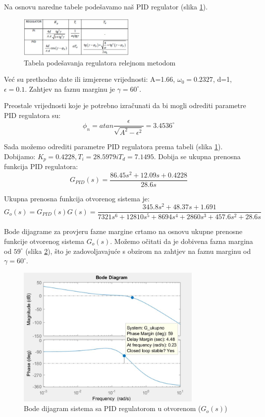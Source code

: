 Na osnovu naredne tabele podešavamo naš PID regulator (slika \ref{fig:z3_3}).

\begin{figure} [H]
  \centering
  \includegraphics[width=0.5\textwidth]{z3_3}
  \caption{Tabela podešavanja regulatora relejnom metodom}
  \label{fig:z3_3}
\end{figure}

Već su prethodno date ili izmjerene vrijednosti: A=1.66, $\omega_0=0.2327$, d=1, $\epsilon=0.1$. Zahtjev na faznu marginu je $\gamma=60^{\circ}$.

Preostale vrijednosti koje je potrebno izračunati da bi mogli odrediti parametre PID regulatora su:
	\[\phi_n=atan\frac{\epsilon}{\sqrt{A^2-\epsilon^2}}=3.4536^{\circ}\]

Sada možemo odrediti parametre PID regulatora prema tabeli (slika \ref{fig:z3_3}). Dobijamo:        $K_p=0.4228, T_i=28.5979 i T_d=7.1495$. Dobija se ukupna prenosna funkcija PID regulatora:
	\[G_{PID} (s)=\frac{86.45s^2+12.09s+0.4228}{28.6s}\]

Ukupna prenosna funkcija otvorenog sistema je:
	\[G_o (s)=G_{PID} (s)G(s)=\frac{345.8s^2+48.37s+1.691}{7321s^6+12810s^5+8694s^4+2860s^3+457.6s^2+28.6s} \]

Bode dijagrame za provjeru fazne margine crtamo na osnovu ukupne prenosne funkcije otvorenog sistema $G_o (s)$. Možemo očitati da je dobivena fazna margina od $59^{\circ}$ (slika \ref{fig:z3_4}), što je zadovoljavajuće s obzirom na zahtjev na faznu marginu od $\gamma=60^{\circ}$.

\begin{figure} [H]
  \centering
  \includegraphics[width=0.8\textwidth]{z3_4}
  \caption{Bode dijagram sistema sa PID regulatorom u otvorenom ($G_o (s)$)}
  \label{fig:z3_4}
\end{figure}




























